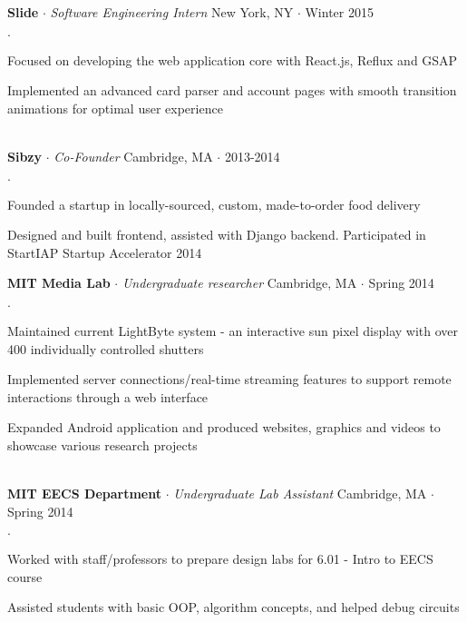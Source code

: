 \documentclass{article}
\newcommand{\employer}[4]{{ \textbf{#1} $\cdot$ \emph{#3} \hfill #4 $\cdot$ #2 }}
\newenvironment{achievements}{\begin{list}{$\cdot$}{\topsep 0pt \itemsep -2pt}}{\vspace*{4pt}\end{list}}
\begin{document}
\employer{Slide}{Winter 2015}{Software Engineering Intern}{New York, NY}
    \begin{achievements}
                \item{Focused on developing the web application core with React.js, Reflux and GSAP}
                \item{Implemented an advanced card parser and account pages with smooth transition animations for optimal user experience}


	\end{achievements}
  \\
 
  \employer{Sibzy}{2013-2014}{Co-Founder}{Cambridge, MA}
    \begin{achievements}
                \item{Founded a startup in locally-sourced, custom, made-to-order food delivery}
                \item{Designed and built frontend, assisted with Django backend. Participated in StartIAP Startup Accelerator 2014}

	\end{achievements}

\employer{MIT Media Lab}{Spring 2014}{Undergraduate researcher}{Cambridge, MA}
    \begin{achievements}
                \item{Maintained current LightByte system - an interactive sun pixel display with over 400 individually controlled shutters }
                \item { Implemented server connections/real-time streaming features to support remote interactions through a web interface }
                \item{Expanded Android application and produced websites, graphics and videos to showcase various research projects }  
                
	\end{achievements}
  \\
 
\employer{MIT EECS Department}{Spring 2014}{Undergraduate Lab Assistant}{Cambridge, MA}
	\begin{achievements}
                \item{Worked with staff/professors to prepare design labs for 6.01 - Intro to EECS course}
                \item{Assisted students with basic OOP, algorithm concepts, and helped debug circuits}
            
	\end{achievements}
	
\end{document}
